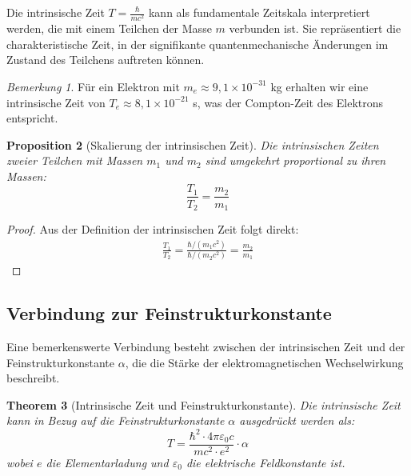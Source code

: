 \documentclass{article}
\newtheorem{theorem}{Theorem}[section]
\newtheorem{proposition}[theorem]{Proposition}
\theoremstyle{definition}
\theoremstyle{remark}
\newtheorem{remark}[theorem]{Bemerkung}
\begin{document}
		Die intrinsische Zeit $T = \frac{\hbar}{mc^2}$ kann als fundamentale Zeitskala interpretiert werden, die mit einem Teilchen der Masse $m$ verbunden ist. Sie repräsentiert die charakteristische Zeit, in der signifikante quantenmechanische Änderungen im Zustand des Teilchens auftreten können.
		
		\begin{remark}
			Für ein Elektron mit $m_e \approx 9,1 \times 10^{-31}$ kg erhalten wir eine intrinsische Zeit von $T_e \approx 8,1 \times 10^{-21}$ s, was der Compton-Zeit des Elektrons entspricht.
		\end{remark}
		
		\begin{proposition}[Skalierung der intrinsischen Zeit]
			Die intrinsischen Zeiten zweier Teilchen mit Massen $m_1$ und $m_2$ sind umgekehrt proportional zu ihren Massen:
			\begin{equation}
				\frac{T_1}{T_2} = \frac{m_2}{m_1}
			\end{equation}
		\end{proposition}
		\begin{proof}
			Aus der Definition der intrinsischen Zeit folgt direkt:
			\begin{align}
				\frac{T_1}{T_2} = \frac{\hbar/(m_1c^2)}{\hbar/(m_2c^2)} = \frac{m_2}{m_1}
			\end{align}
		\end{proof}
		
		\subsection{Verbindung zur Feinstrukturkonstante}
		
		Eine bemerkenswerte Verbindung besteht zwischen der intrinsischen Zeit und der Feinstrukturkonstante $\alpha$, die die Stärke der elektromagnetischen Wechselwirkung beschreibt.
		
		\begin{theorem}[Intrinsische Zeit und Feinstrukturkonstante]
			Die intrinsische Zeit kann in Bezug auf die Feinstrukturkonstante $\alpha$ ausgedrückt werden als:
			\begin{equation}
				T = \frac{\hbar^2 \cdot 4\pi\varepsilon_0 c}{mc^2 \cdot e^2} \cdot \alpha
			\end{equation}
			wobei $e$ die Elementarladung und $\varepsilon_0$ die elektrische Feldkonstante ist.
		\end{theorem}
		
\end{document}
